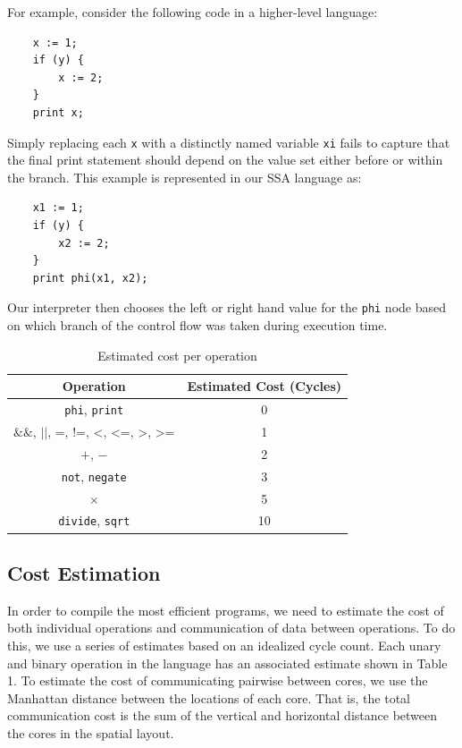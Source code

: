 \documentclass{sig-alternate-05-2015}
\begin{document}
For example, consider the following code in a higher-level language:
\begin{verbatim}
    x := 1;
    if (y) {
        x := 2;
    }
    print x;
\end{verbatim}

Simply replacing each \texttt{x} with a distinctly named variable \texttt{xi} fails to capture that the final print statement should depend on the value set either before or within the branch. This example is represented in our SSA language as:
\begin{verbatim}
    x1 := 1;
    if (y) {
        x2 := 2;
    }
    print phi(x1, x2);
\end{verbatim}

Our interpreter then chooses the left or right hand value for the \texttt{phi} node based on which branch of the control flow was taken during execution time. 

\begin{table}
\begin{center}
  \label{tab:cost}
  \begin{tabular}{cc}
    \hline
    Operation&Estimated Cost (Cycles) \\
    \hline
    \hline
    \texttt{phi}, \texttt{print} & 0 \\
    $\&\&$, $||$, =, !=, <, <=, >, >= & 1 \\
    $+$, $-$ & 2\\
    \texttt{not}, \texttt{negate} & 3\\
    $\times$& 5\\
    \texttt{divide}, \texttt{sqrt} & 10\\
  \hline
\end{tabular}
\end{center}
\caption{Estimated cost per operation}
\end{table}

\subsection{Cost Estimation}
In order to compile the most efficient programs, we need to estimate the cost of both individual operations and communication of data between operations. To do this, we use a series of estimates based on an idealized cycle count. Each unary and binary operation in the language has an associated estimate shown in Table 1. To estimate the cost of communicating pairwise between cores, we use the Manhattan distance between the locations of each core. That is, the total communication cost is the sum of the vertical and horizontal distance between the cores in the spatial layout. 
\end{document}
